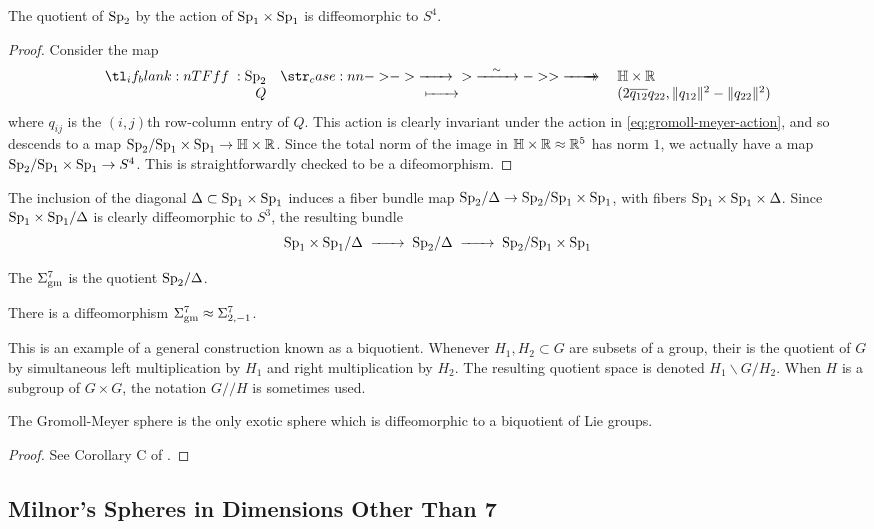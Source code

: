 \begin{proposition}
	The quotient of $\mathrm{Sp}_2$ by the action of $\mathrm{Sp}_1\times \mathrm{Sp}_1$ is diffeomorphic to $S^4$.
\end{proposition}
\begin{proof}
	Consider the map
	\[
		\lkxfunc{f}{\Sp_2}{\HH\times \R}{Q}{(2\overline{q_{12}}q_{22}, \|q_{12}\|^2 - \|q_{22}\|^2)}
	\]
	where $q_{ij}$ is the $(i,j)$th row-column entry of $Q$. This action is clearly invariant under the action in \cref{eq:gromoll-meyer-action}, and so descends to a map $\mathrm{Sp}_2/\mathrm{Sp}_1\times \mathrm{Sp}_1 \to \mathbb{H}\times \mathbb{R}$. Since the total norm of the image in $\mathbb{H}\times \mathbb{R}\approx \mathbb{R}^5$ has norm $1$, we actually have a map $\mathrm{Sp}_2/\mathrm{Sp}_1\times \mathrm{Sp}_1\to S^4$. This is straightforwardly checked to be a difeomorphism.
\end{proof}

The inclusion of the diagonal $\Delta \subset \mathrm{Sp}_1\times \mathrm{Sp}_1$ induces a fiber bundle map $\mathrm{Sp}_2/\Delta \to \mathrm{Sp}_2/\mathrm{Sp}_1\times \mathrm{Sp}_1$, with fibers $\mathrm{Sp}_1\times \mathrm{Sp}_1\times \Delta$. Since $\mathrm{Sp}_1\times \mathrm{Sp}_1/\Delta$ is clearly diffeomorphic to $S^3$, the resulting bundle
\[
	\Sp_1\times\Sp_1/\Delta \lkxto \Sp_2/\Delta \lkxto \Sp_2/\Sp_1\times \Sp_1
\]

\begin{definition}
	The  $\Sigma^7_{\mathrm{gm}}$ is the quotient $\mathrm{Sp}_2/\Delta$.
\end{definition}

\begin{proposition}
	There is a diffeomorphism $\Sigma^7_{\mathrm{gm}} \approx \Sigma^7_{2,-1}$.
\end{proposition}

This is an example of a general construction known as a biquotient. Whenever $H_1,H_2\subset G$ are subsets of a group, their  is the quotient of $G$ by simultaneous left multiplication by $H_1$ and right multiplication by $H_2$. The resulting quotient space is denoted $H_1\backslash G/H_2$. When $H$ is a subgroup of $G\times G$, the notation $G/\!/H$ is sometimes used.

\begin{theorem}
	The Gromoll-Meyer sphere is the only exotic sphere which is diffeomorphic to a biquotient of Lie groups.
\end{theorem}
\begin{proof}
	See Corollary C of \cite{KZ2004biquotients}.
\end{proof}

\subsection{Milnor's Spheres in Dimensions Other Than 7}

